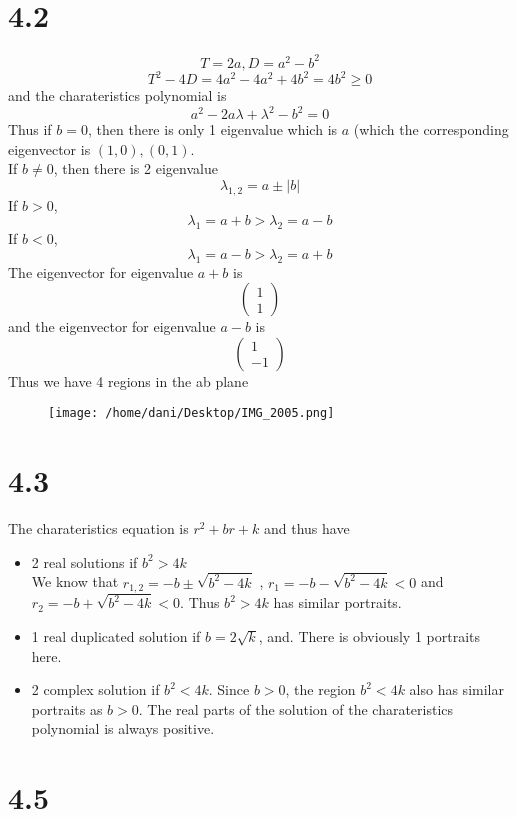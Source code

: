 \documentclass[11pt]{article}
\theoremstyle{mystyle}
\theoremstyle{definition}
\begin{document}
\section*{4.2}
\[
  T = 2a, D = a^2-b^2
\]
\[
  T^2 - 4D = 4a^2 -4a^2 + 4b^2 = 4b^2\ge 0
\]
and the charateristics polynomial is 
\[
  a^2 - 2a\lambda + \lambda^2 -b^2 = 0 
\]
Thus if $b = 0$, then there is only 1 eigenvalue which is $a$ (which the corresponding eigenvector is $(1,0),(0,1)$. \\ 
If $b \ne 0$, then there is 2 eigenvalue 
\[
  \lambda_{1,2} = a \pm |b|
\]
If $b > 0$,  
\[
  \lambda_{1} = a + b > 
  \lambda_{2} = a - b
\]
If $b < 0$, 
\[
  \lambda_{1} = a - b > \lambda_2 = a+b 
\]
The eigenvector for eigenvalue $ a + b$ is
\[
  \begin{pmatrix}
    1 \\ 1
  \end{pmatrix}
\]
and the eigenvector for eigenvalue $ a - b$ is \[
  \begin{pmatrix}
    1 \\ -1
  \end{pmatrix}
\]
Thus we have 4 regions in the ab plane 

\begin{figure}[h]
  \centering
  \texttt{[image: /home/dani/Desktop/IMG\_2005.png]}
  \caption{}
  \label{fig:img_2005}
\end{figure}

\clearpage
\section*{4.3}
The charateristics equation is $r^2 +br + k$ and thus 
have  
\begin{itemize}
  \item 2 real solutions if $b^2 > 4k$ \\
    We know that $r_{1,2} = -b \pm \sqrt{b^2 -4k}$
    , $r_1 = -b - \sqrt{b^2-4k} < 0$ and $r_2 = -b + \sqrt{b^2 - 4k} < 0$. Thus $b^2 > 4k$ has similar portraits. 
  \item 1 real duplicated solution if $b = 2\sqrt{k}$, and. There is obviously 1 portraits here.  
  \item 2 complex solution if $b^2 < 4k$. 
    Since $b>0$, the region $b^2 < 4k$ also has similar portraits as $b>0$. The real parts of the solution of the charateristics polynomial is always positive.
\end{itemize}
\clearpage
\section*{4.5}
\end{document}
